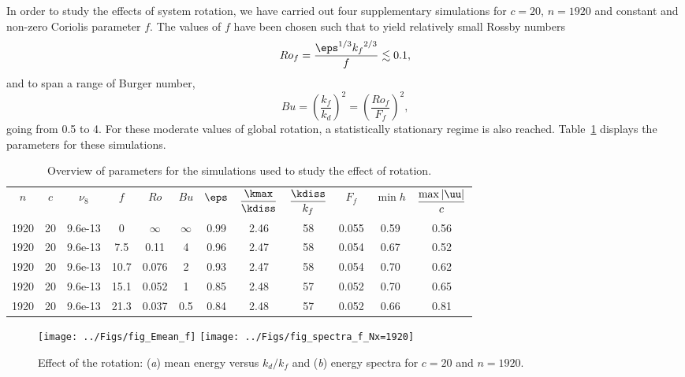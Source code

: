 


In order to study the effects of system rotation, we have carried
out four supplementary simulations for $c = 20$, $n = 1920$ and
constant and non-zero Coriolis parameter $f$.  The values of $f$ have
been chosen such that to yield relatively small Rossby numbers
\begin{equation}
Ro_f = \frac{\eps^{1/3} {k_f}^{2/3}}{f} \lesssim 0.1,
\end{equation}
and to span a range of Burger number,
\begin{equation}
Bu = \left(\frac{k_f}{k_d}\right)^2 = \left(\frac{Ro_f}{F_f}\right)^2,
\end{equation}
going from 0.5 to 4.  For these moderate values of global rotation, a
statistically stationary regime is also reached.  Table~\ref{tab_rot}
displays the parameters for these simulations.
\begin{table}
\begin{center}
\begin{tabular}{cc@{\hskip 8mm}c@{\hskip 8mm}ccc@{\hskip 8mm}cccc@{\hskip 8mm}cc}
$n$ & $c$ & $\nu_8$ & $f$ & $Ro$ & $Bu$ & $\eps$ & $\displaystyle\frac{\kmax}{\kdiss}$ & $\displaystyle\frac{\kdiss}{k_f}$ & $F_f$ & $\min h$ & $\displaystyle\frac{\max |\uu|}{c}$ \\[3mm]
1920 &   20 & 9.6e-13 &  0   &  $\infty$ & $\infty$ & 0.99 & 2.46 &  58 &  0.055 & 0.59 & 0.56 \\
1920 &   20 & 9.6e-13 &  7.5 &   0.11 &      4 & 0.96 & 2.47 &  58 &  0.054 & 0.67 & 0.52 \\
1920 &   20 & 9.6e-13 & 10.7 &  0.076 &      2 & 0.93 & 2.47 &  58 &  0.054 & 0.70 & 0.62 \\
1920 &   20 & 9.6e-13 & 15.1 &  0.052 &      1 & 0.85 & 2.48 &  57 &  0.052 & 0.70 & 0.65 \\
1920 &   20 & 9.6e-13 & 21.3 &  0.037 &    0.5 & 0.84 & 2.48 &  57 &  0.052 & 0.66 & 0.81 \\
\end{tabular}
\caption{Overview of parameters for the simulations used to study the effect of rotation. 
}
\label{tab_rot}
\end{center}
\end{table}



\begin{figure}
\centerline{
\texttt{[image: ../Figs/fig\_Emean\_f]}
\texttt{[image: ../Figs/fig\_spectra\_f\_Nx=1920]}
}
\caption{Effect of the rotation: (\textit{a}) mean energy versus
$k_d/k_f$ and (\textit{b}) energy spectra for $c = 20$ and $n =
1920$.}
\label{fig_effectBu}
\end{figure}


